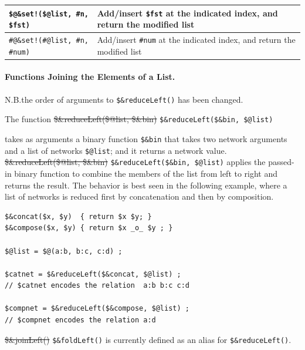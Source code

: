 \documentclass[letterpaper,12pt]{article}
\begin{document}
\vspace{.5cm}

\noindent
\begin{tabular}{|l|p{5.5cm}|}
\hline
\verb+$@&set!($@list, #n, $fst)+ & Add/insert \verb!$fst! at the indicated index, and return the
modified list\\
\hline
\verb+#@&set!(#@list, #n, #num)+ & Add/insert \verb!#num! at the indicated index, and return the
modified list\\
\hline
\end{tabular}

\vspace{.5cm}

\paragraph{Functions Joining the Elements of a List.}

\begin{samepage}
\begin{changebar}
N.B.\@ the order of arguments to \verb!$&reduceLeft()! has been changed.

The function \sout{\$\&reduceLeft(\$@list, \$\&bin)}
\verb!$&reduceLeft($&bin, $@list)!  

\end{changebar}
\end{samepage}

\noindent
takes as arguments a binary function
\verb!$&bin! that takes two network arguments and a list of networks
\verb!$@list!; and it returns a network value.
\sout{\$\&reduceLeft(\$@list, \$\&bin)} 
\verb!$&reduceLeft($&bin, $@list)!  
applies the passed-in binary function to combine the members of
the list from left to right and returns the result.  The behavior is best
seen in the following example, where a list of networks is reduced first
by concatenation and then by composition.

\begin{samepage}
\begin{changebar}

\begin{Verbatim}[fontsize=\small]
$&concat($x, $y)  { return $x $y; }
$&compose($x, $y) { return $x _o_ $y ; }

$@list = $@(a:b, b:c, c:d) ;

$catnet = $&reduceLeft($&concat, $@list) ;
// $catnet encodes the relation  a:b b:c c:d

$compnet = $&reduceLeft($&compose, $@list) ;
// $compnet encodes the relation a:d
\end{Verbatim}

\noindent
\sout{\$\&joinLeft()}
\verb!$&foldLeft()! is currently defined as an alias for \verb!$&reduceLeft()!.

\end{changebar}
\end{samepage}
\end{document}
